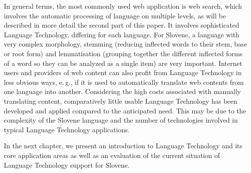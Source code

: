 \begin{multicols}{2}
In general terms, the most commonly used web application is web search, which involves the automatic processing of language on multiple levels, as will be described in more detail the second part of this paper. It involves sophisticated Language Technology, differing for each language. For Slovene, a language with very complex morphology,   stemming (reducing inflected words to their stem, base or root form) and lemmatisation (grouping together the different inflected forms of a word so they can be analyzed as a single item) are very important. Internet users and providers of web content can also profit from Language Technology in less obvious ways, e.\,g., if it is used to automatically translate web contents from one language into another. Considering the high costs associated with manually translating content, comparatively little usable Language Technology has been developed and applied compared to the anticipated need. This may be due to the complexity of the Slovene language and the number of technologies involved in typical Language Technology applications. 

In the next chapter, we present an introduction to Language Technology and its core application areas as well as an evaluation of the current situation of Language Technology support for Slovene. 
\end{multicols}

\clearpage


